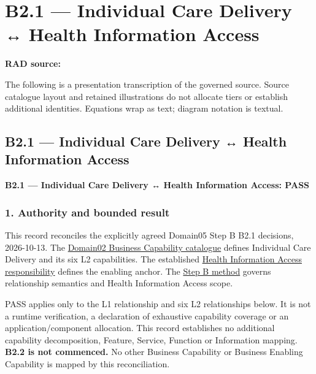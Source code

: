 \chapter{B2.1 — Individual Care Delivery ↔ Health Information Access}\label{rad:b2-1}
\noindent\textbf{RAD source:} \texttt{}

The following is a presentation transcription of the governed source. Source catalogue layout and retained illustrations do not allocate tiers or establish additional identities. Equations wrap as text; diagram notation is textual.

\label{rad:b2-1:1}
\label{rad:b2-1:3}
\section*{B2.1 — Individual Care Delivery ↔ Health Information Access}
\label{rad:b2-1:5}

\textbf{B2.1 — Individual Care Delivery ↔ Health Information Access: PASS}

\label{rad:b2-1:7}
\subsection*{1. Authority and bounded result}
\label{rad:b2-1:9}

This record reconciles the explicitly agreed Domain05 Step B B2.1 decisions, 2026-10-13. The \hyperref[rad:business:148]{Domain02 Business Capability catalogue} defines Individual Care Delivery and its six L2 capabilities. The established \hyperref[rad:ise:72]{Health Information Access responsibility} defines the enabling anchor. The \href{https://github.com/fhirfactory/harmonia/blob/98410db60155198a75f74c79d98060070209faa1/docs/markdown/05-information-systems-architecture/traceability/step-b-method.md\#capability-enablement-semantics}{Step B method} governs relationship semantics and Health Information Access scope.

\label{rad:b2-1:16}

PASS applies only to the L1 relationship and six L2 relationships below. It is not a runtime verification, a declaration of exhaustive capability coverage or an application/\allowbreak{}component allocation. This record establishes no additional capability decomposition, Feature, Service, Function or Information mapping. \textbf{B2.2 is not commenced.} No other Business Capability or Business Enabling Capability is mapped by this reconciliation.

